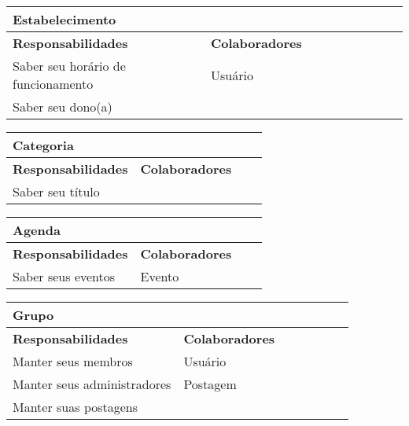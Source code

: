 \documentclass{article}
\begin{document}
    
    \begin{center}
   	 \begin{tabular}{|p{0.5\linewidth}|p{0.5\linewidth}|}
\hline
 	\multicolumn{2}{|p{\textwidth}|}{
{\large \textbf{Estabelecimento}}
}  \\
\hline
\textbf{Responsabilidades} & \textbf{Colaboradores} \\ 
\hline
  	Saber seu horário de funcionamento & Usuário \\
  	\hline
  	Saber seu dono(a) &  \\
  	\hline
   	\end{tabular} 
    \end{center}
    
    
    \begin{center}
   	 \begin{tabular}{|p{0.5\linewidth}|p{0.5\linewidth}|}
\hline
 	\multicolumn{2}{|p{\textwidth}|}{
{\large \textbf{Categoria}}
}  \\
\hline
\textbf{Responsabilidades} & \textbf{Colaboradores} \\ 
\hline
  	Saber seu título &  \\
  	\hline
   	\end{tabular} 
    \end{center}
    
    
    \begin{center}
   	 \begin{tabular}{|p{0.5\linewidth}|p{0.5\linewidth}|}
\hline
 	\multicolumn{2}{|p{\textwidth}|}{
{\large \textbf{Agenda}}
}  \\
\hline
\textbf{Responsabilidades} & \textbf{Colaboradores} \\ 
\hline
  	Saber seus eventos & Evento \\
  	\hline
   	\end{tabular} 
    \end{center}
    
    
    \begin{center}
   	 \begin{tabular}{|p{0.5\linewidth}|p{0.5\linewidth}|}
\hline
 	\multicolumn{2}{|p{\textwidth}|}{
{\large \textbf{Grupo}}
}  \\
\hline
\textbf{Responsabilidades} & \textbf{Colaboradores} \\ 
\hline
  	Manter seus membros & Usuário \\
  	\hline
  	Manter seus administradores & Postagem \\
  	\hline
  	Manter suas postagens & \\
  	\hline
   	\end{tabular} 
    \end{center}
    
\end{document}
